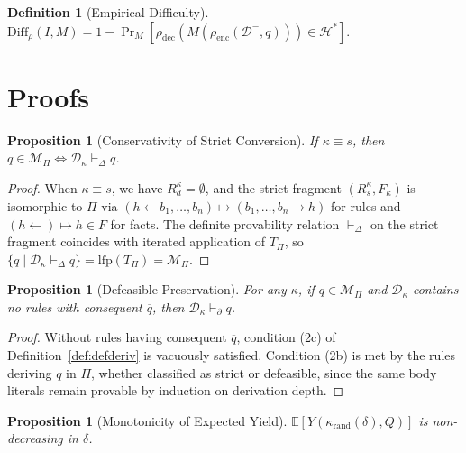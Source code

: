 \documentclass{article}
\newtheorem{proposition}[theorem]{Proposition}
\theoremstyle{definition}
\newtheorem{definition}[theorem]{Definition}
\newcommand{\D}{\mathcal{D}}
\newcommand{\Dm}{\mathcal{D}^{-}}
\newcommand{\Hgold}{\mathcal{H}^{*}}
\newcommand{\Rs}{R_s}
\newcommand{\Rd}{R_d}
\newcommand{\partfunc}{\kappa}
\newcommand{\Diff}{\mathrm{Diff}}
\newcommand{\pDelta}{\vdash_{\Delta}}
\newcommand{\pPartial}{\vdash_{\partial}}
\newcommand{\strictto}{\rightarrow}
\newcommand{\comp}[1]{\overline{#1}}
\begin{document}
\begin{definition}[Empirical Difficulty]\label{def:empdiff}
$\Diff_\rho(I, M) = 1 - \Pr_M[\rho_{\mathrm{dec}}(M(\rho_{\mathrm{enc}}(\Dm, q))) \in \Hgold]$.
\end{definition}


\section{Proofs}\label{app:proofs}

\begin{proposition}[Conservativity of Strict Conversion]\label{prop:strict}
If $\partfunc \equiv s$, then $q \in \mathcal{M}_\Pi \iff \D_\partfunc \pDelta q$.
\end{proposition}

\begin{proof}
When $\partfunc \equiv s$, we have $\Rd^{\partfunc} = \emptyset$, and the strict fragment $(\Rs^{\partfunc}, F_\partfunc)$ is isomorphic to $\Pi$ via $(h \leftarrow b_1, \ldots, b_n) \mapsto (b_1, \ldots, b_n \strictto h)$ for rules and $(h \leftarrow) \mapsto h \in F$ for facts. The definite provability relation $\pDelta$ on the strict fragment coincides with iterated application of $T_\Pi$, so $\{q \mid \D_\partfunc \pDelta q\} = \mathrm{lfp}(T_\Pi) = \mathcal{M}_\Pi$.
\end{proof}

\begin{proposition}[Defeasible Preservation]\label{prop:defpres}
For any $\partfunc$, if $q \in \mathcal{M}_\Pi$ and $\D_\partfunc$ contains no rules with consequent $\comp{q}$, then $\D_\partfunc \pPartial q$.
\end{proposition}

\begin{proof}
Without rules having consequent $\comp{q}$, condition (2c) of Definition~\ref{def:defderiv} is vacuously satisfied. Condition (2b) is met by the rules deriving $q$ in $\Pi$, whether classified as strict or defeasible, since the same body literals remain provable by induction on derivation depth.
\end{proof}

\begin{proposition}[Monotonicity of Expected Yield]\label{prop:yieldmono}
$\mathbb{E}[Y(\partfunc_{\mathrm{rand}}(\delta), Q)]$ is non-decreasing in $\delta$.
\end{proposition}
\end{document}
